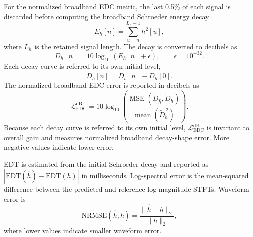 \documentclass{article}
\begin{document}
For the normalized broadband EDC metric, the last 0.5\% of each signal is
discarded before computing the broadband Schroeder energy decay
\begin{equation}
E_h[n]
=
\sum_{u=n}^{L_h-1} h^2[u],
\end{equation}
where $L_h$ is the retained signal length. The decay is converted to decibels
as
\begin{equation}
D_h[n]
=
10\log_{10}\!\left(E_h[n]+\epsilon\right),
\qquad \epsilon=10^{-32}.
\end{equation}
Each decay curve is referred to its own initial level,
\begin{equation}
\widetilde D_h[n]
=
D_h[n]-D_h[0].
\end{equation}
The normalized broadband EDC error is reported in decibels as
\begin{equation}
\mathcal{L}_{\mathrm{EDC}}^{\mathrm{dB}}
=
10\log_{10}\!\left(
\frac{
\operatorname{MSE}\!\left(
\widetilde D_{\widehat h},
\widetilde D_h
\right)}
{
\operatorname{mean}\!\left(
\widetilde D_h^{\,2}
\right)}
\right).
\label{eq:edc}
\end{equation}
Because each decay curve is referred to its own initial level,
$\mathcal{L}_{\mathrm{EDC}}^{\mathrm{dB}}$ is invariant to overall gain and
measures normalized broadband decay-shape error. More negative values
indicate lower error.

EDT is estimated from the initial Schroeder decay and reported as
$|\mathrm{EDT}(\widehat h)-\mathrm{EDT}(h)|$ in milliseconds.
Log-spectral error is the mean-squared difference between the predicted and
reference log-magnitude STFTs. Waveform error is
\begin{equation}
\mathrm{NRMSE}(\widehat h,h)
=
\frac{\|\widehat h-h\|_2}{\|h\|_2},
\label{eq:nrmse}
\end{equation}
where lower values indicate smaller waveform error.
\end{document}
